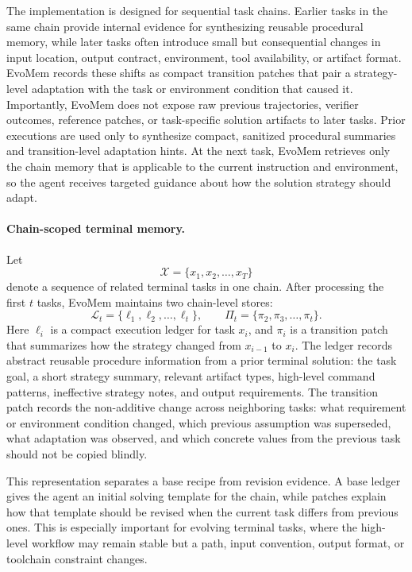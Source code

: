 \documentclass{llmxive}
\begin{document}
The implementation is designed for sequential task chains. Earlier tasks in the same chain provide internal evidence for synthesizing reusable procedural memory, while later tasks often introduce small but consequential changes in input location, output contract, environment, tool availability, or artifact format. EvoMem records these shifts as compact transition patches that pair a strategy-level adaptation with the task or environment condition that caused it. Importantly, EvoMem does not expose raw previous trajectories, verifier outcomes, reference patches, or task-specific solution artifacts to later tasks. Prior executions are used only to synthesize compact, sanitized procedural summaries and transition-level adaptation hints. At the next task, EvoMem retrieves only the chain memory that is applicable to the current instruction and environment, so the agent receives targeted guidance about how the solution strategy should adapt.

\paragraph{Chain-scoped terminal memory.}
Let
\[
\mathcal{X}=\{x_1,x_2,\ldots,x_T\}
\]
denote a sequence of related terminal tasks in one chain. After processing the first $t$ tasks, EvoMem maintains two chain-level stores:
\[
\mathcal{L}_t=\{\ell_1,\ell_2,\ldots,\ell_t\},
\qquad
\Pi_t=\{\pi_2,\pi_3,\ldots,\pi_t\}.
\]
Here $\ell_i$ is a compact execution ledger for task $x_i$, and $\pi_i$ is a transition patch that summarizes how the strategy changed from $x_{i-1}$ to $x_i$. The ledger records abstract reusable procedure information from a prior terminal solution: the task goal, a short strategy summary, relevant artifact types, high-level command patterns, ineffective strategy notes, and output requirements. The transition patch records the non-additive change across neighboring tasks: what requirement or environment condition changed, which previous assumption was superseded, what adaptation was observed, and which concrete values from the previous task should not be copied blindly.

This representation separates a base recipe from revision evidence. A base ledger gives the agent an initial solving template for the chain, while patches explain how that template should be revised when the current task differs from previous ones. This is especially important for evolving terminal tasks, where the high-level workflow may remain stable but a path, input convention, output format, or toolchain constraint changes.
\end{document}
